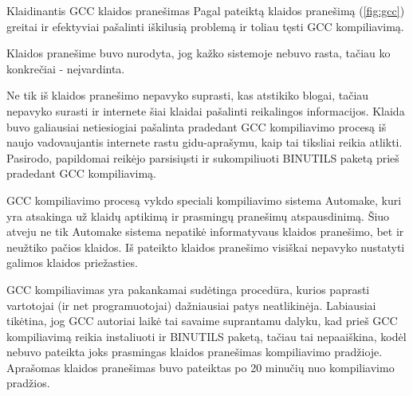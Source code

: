 \begin{xcase}{Klaidinantis GCC klaidos pranešimas}
  \xcgoal
  {
    Pagal pateiktą klaidos pranešimą (\ref{fig:gcc}) greitai ir efektyviai pašalinti iškilusią problemą ir
    toliau tęsti GCC kompiliavimą.
  }
  
  \xctools
  {
    Klaidos pranešime buvo nurodyta, jog kažko sistemoje nebuvo rasta, tačiau ko konkrečiai - 
    neįvardinta.
  }
  
  \xcresult
  {
    Ne tik iš klaidos pranešimo nepavyko suprasti, kas atstikiko blogai, tačiau nepavyko 
    surasti ir internete šiai klaidai pašalinti reikalingos informacijos.
    Klaida buvo galiausiai netiesiogiai pašalinta pradedant GCC kompiliavimo procesą iš naujo
    vadovaujantis internete rastu gidu-aprašymu, kaip tai tiksliai reikia atlikti. Pasirodo,
    papildomai reikėjo parsisiųsti ir sukompiliuoti BINUTILS paketą prieš pradedant GCC 
    kompiliavimą.
  }
  
  \xcprinciples
  {
    {
      GCC kompiliavimo procesą vykdo speciali kompiliavimo sistema Automake, kuri yra atsakinga
      už klaidų aptikimą ir prasmingų pranešimų atspausdinimą. Šiuo atveju ne tik Automake 
      sistema nepatikė informatyvaus klaidos pranešimo, bet ir neužtiko pačios klaidos.
    }
    {
      Iš pateikto klaidos pranešimo visiškai nepavyko nustatyti galimos klaidos priežasties.
    }
  }
  
  \xcthoughts
  {
    GCC kompiliavimas yra pakankamai sudėtinga procedūra, kurios paprasti vartotojai 
    (ir net programuotojai) dažniausiai patys neatlikinėja. Labiausiai tikėtina, jog GCC
    autoriai laikė tai savaime suprantamu dalyku, kad prieš GCC kompiliavimą reikia instaliuoti
    ir BINUTILS paketą, tačiau tai nepaaiškina, kodėl nebuvo pateikta joks prasmingas klaidos
    pranešimas kompiliavimo pradžioje. Aprašomas klaidos pranešimas buvo pateiktas po 20 minučių
    nuo kompiliavimo pradžios.
  }
\end{xcase}
